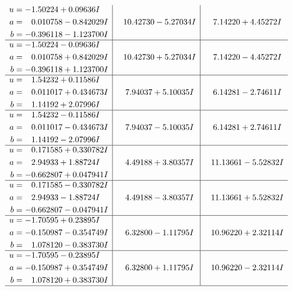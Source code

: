 \documentclass[1p]{elsarticle_modified}
\theoremstyle{definition}
\begin{document}
$$\begin{array}{c|c|c}
\begin{aligned}
u &= -1.50224 + 0.09636 I \\
a &= \phantom{-}0.010758 - 0.842029 I \\
b &= -0.396118 - 1.123700 I\end{aligned}
 & \phantom{-}10.42730 - 5.27034 I & \phantom{-}7.14220 + 4.45272 I \\ \hline\begin{aligned}
u &= -1.50224 - 0.09636 I \\
a &= \phantom{-}0.010758 + 0.842029 I \\
b &= -0.396118 + 1.123700 I\end{aligned}
 & \phantom{-}10.42730 + 5.27034 I & \phantom{-}7.14220 - 4.45272 I \\ \hline\begin{aligned}
u &= \phantom{-}1.54232 + 0.11586 I \\
a &= \phantom{-}0.011017 + 0.434673 I \\
b &= \phantom{-}1.14192 + 2.07996 I\end{aligned}
 & \phantom{-}7.94037 + 5.10035 I & \phantom{-}6.14281 - 2.74611 I \\ \hline\begin{aligned}
u &= \phantom{-}1.54232 - 0.11586 I \\
a &= \phantom{-}0.011017 - 0.434673 I \\
b &= \phantom{-}1.14192 - 2.07996 I\end{aligned}
 & \phantom{-}7.94037 - 5.10035 I & \phantom{-}6.14281 + 2.74611 I \\ \hline\begin{aligned}
u &= \phantom{-}0.171585 + 0.330782 I \\
a &= \phantom{-}2.94933 + 1.88724 I \\
b &= -0.662807 + 0.047941 I\end{aligned}
 & \phantom{-}4.49188 + 3.80357 I & \phantom{-}11.13661 - 5.52832 I \\ \hline\begin{aligned}
u &= \phantom{-}0.171585 - 0.330782 I \\
a &= \phantom{-}2.94933 - 1.88724 I \\
b &= -0.662807 - 0.047941 I\end{aligned}
 & \phantom{-}4.49188 - 3.80357 I & \phantom{-}11.13661 + 5.52832 I \\ \hline\begin{aligned}
u &= -1.70595 + 0.23895 I \\
a &= -0.150987 - 0.354749 I \\
b &= \phantom{-}1.078120 - 0.383730 I\end{aligned}
 & \phantom{-}6.32800 - 1.11795 I & \phantom{-}10.96220 + 2.32114 I \\ \hline\begin{aligned}
u &= -1.70595 - 0.23895 I \\
a &= -0.150987 + 0.354749 I \\
b &= \phantom{-}1.078120 + 0.383730 I\end{aligned}
 & \phantom{-}6.32800 + 1.11795 I & \phantom{-}10.96220 - 2.32114 I\\
 \hline 
 \end{array}$$\newpage
\end{document}
